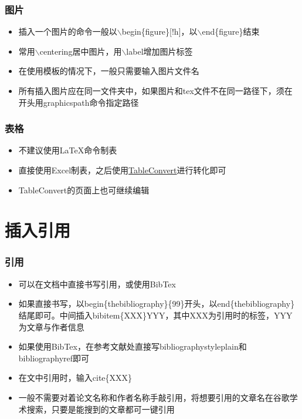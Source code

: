 \documentclass[xetex,mathserif,serif]{beamer}
\begin{document}
\begin{frame} 
    \frametitle{图片} 
    \begin{itemize} 
        \item 插入一个图片的命令一般以{$\backslash$begin\{figure\}[!h]}，以$\backslash$end\{figure\}结束
        \item 常用$\backslash$centering居中图片，用$\backslash$label增加图片标签
        \item 在使用模板的情况下，一般只需要输入图片文件名
        \item 所有插入图片应在同一文件夹中，如果图片和tex文件不在同一路径下，须在开头用graphicspath命令指定路径
    \end{itemize} 
\end{frame}

\begin{frame} 
    \frametitle{表格} 
    \begin{itemize} 
        \item 不建议使用\LaTeX{}命令制表
        \item 直接使用Excel制表，之后使用\href{https://tableconvert.com/}{TableConvert}进行转化即可
        \item TableConvert的页面上也可继续编辑
    \end{itemize} 
\end{frame}

\section{插入引用}
\begin{frame} 
    \frametitle{引用} 
    \begin{itemize} 
        \item 可以在文档中直接书写引用，或使用BibTex
        \item 如果直接书写，以begin\{thebibliography\}\{99\}开头，以end\{thebibliography\}结尾即可。中间插入bibitem\{XXX\}YYY，其中XXX为引用时的标签，YYY为文章与作者信息
        \item 如果使用BibTex，在参考文献处直接写bibliographystyle{plain}和bibliography{ref}即可
        \item 在文中引用时，输入cite\{XXX\}
        \item 一般不需要对着论文名称和作者名称手敲引用，将想要引用的文章名在谷歌学术搜索，只要是能搜到的文章都可一键引用
    \end{itemize} 
\end{frame}
\end{document}
